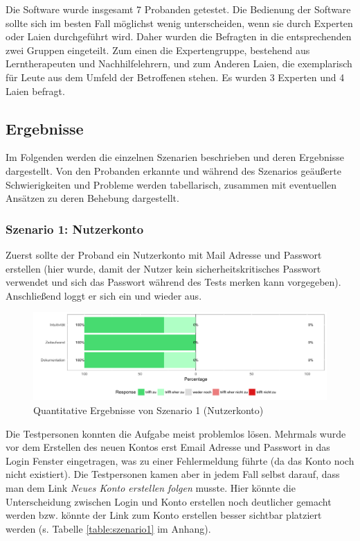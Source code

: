 Die Software wurde insgesamt 7 Probanden getestet. Die Bedienung der Software sollte sich im besten Fall möglichst wenig unterscheiden, wenn sie durch Experten oder Laien durchgeführt wird. Daher wurden die Befragten in die entsprechenden zwei Gruppen eingeteilt. Zum einen die Expertengruppe, bestehend aus Lerntherapeuten und Nachhilfelehrern, und zum Anderen Laien, die exemplarisch für Leute aus dem Umfeld der Betroffenen stehen. Es wurden 3 Experten und 4 Laien befragt.\\

\subsection{Ergebnisse}

Im Folgenden werden die einzelnen Szenarien beschrieben und deren Ergebnisse dargestellt. Von den Probanden erkannte und während des Szenarios geäußerte Schwierigkeiten und Probleme werden tabellarisch, zusammen mit eventuellen Ansätzen zu deren Behebung dargestellt.

\subsubsection{Szenario 1: Nutzerkonto}

Zuerst sollte der Proband ein Nutzerkonto mit Mail Adresse und Passwort erstellen (hier wurde, damit der Nutzer kein sicherheitskritisches Passwort verwendet und sich das Passwort während des Tests merken kann  vorgegeben). Anschließend loggt er sich ein und wieder aus.

\begin{figure}[h!]
	\centering
	\includegraphics[width=.8\linewidth]{figures/evaluation/scenario1}
	\caption{Quantitative Ergebnisse von Szenario 1 (Nutzerkonto)}
	\label{fig:evaluation-sc1}
\end{figure}

Die Testpersonen konnten die Aufgabe meist problemlos lösen. Mehrmals wurde vor dem Erstellen des neuen Kontos erst Email Adresse und Passwort in das Login Fenster eingetragen, was zu einer Fehlermeldung führte (da das Konto noch nicht existiert). Die Testpersonen kamen aber in jedem Fall selbst darauf, dass man dem Link \textit{Neues Konto erstellen folgen} musste. Hier könnte die Unterscheidung zwischen Login und Konto erstellen noch deutlicher gemacht werden bzw. könnte der Link zum Konto erstellen besser sichtbar platziert werden (s. Tabelle \ref{table:szenario1} im Anhang).


